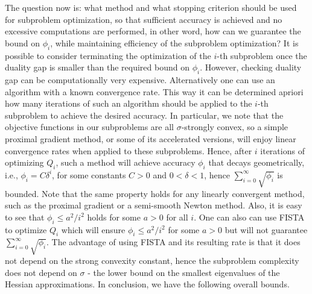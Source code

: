 \documentclass[11pt]{article}
\numberwithin{equation}{section}
\begin{document}
%
The question now is: what method and what stopping criterion should be used for subproblem optimization, so that sufficient accuracy is achieved 
and no excessive computations are performed, in other word, how can we guarantee the bound on $\phi_i$,  
while maintaining efficiency of the subproblem optimization? 
It is possible to consider terminating
 the optimization of the $i$-th subproblem once the duality gap is smaller than the required bound on $\phi_i$.  
 However, checking duality gap can be computationally  very expensive. 
 Alternatively one can use an algorithm with a known  convergence rate. 
 This way it can be determined apriori how many iterations of such an algorithm should be applied to the $i$-th subproblem to achieve the desired accuracy. In particular, we note that the objective functions in our subproblems  are all $\sigma$-strongly convex, so a simple proximal gradient method, or some of its accelerated versions,  will enjoy linear convergence rates when applied to these subproblems.  Hence, after $i$ iterations of optimizing
  $Q_i$,  such a method will achieve accuracy $\phi_i$ that decays geometrically, i.e., $\phi_i=C\delta^i$, for some constants $C>0$ and $0<\delta<1$, hence 
$\sum_{i=0}^{\infty} \sqrt{\phi_i}$ is  bounded.   Note that the same property holds for any linearly convergent  method, such as the proximal gradient or a semi-smooth Newton method. 
 Also, it is easy to see that $\phi_i\leq a^2/i^2$ holds for some $a>0$ for all $i$.   
One can also can use FISTA \cite{Beck2009} to optimize $Q_i$ which will ensure 
$\phi_i\leq a^2/i^2$ for some $a>0$ but will not guarantee $\sum_{i=0}^{\infty} \sqrt{\phi_i}$.
The advantage of using FISTA and its resulting rate is that it does not depend on the strong convexity constant,
 hence the subproblem complexity does 
not depend on  $\sigma$ - the lower bound on the smallest eigenvalues of the Hessian approximations.
 In conclusion, we have the following overall bounds. 
\end{document}
